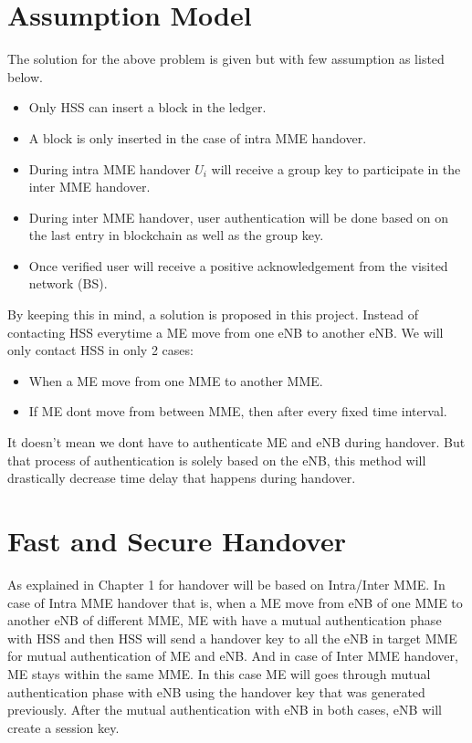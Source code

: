 {    \section{Assumption Model}{
        The solution for the above problem is given but with few 
        assumption as listed below.
        \begin{itemize}
            \item Only HSS can insert a block in the ledger.
            \item A block is only inserted in the case of intra MME handover.
            \item During intra MME handover \(U_i\) will receive a group key to
             participate in the inter MME handover.
            \item During inter MME handover, user authentication will be done based on
             on the last entry in blockchain as well as the group key.
            \item Once verified user will receive a positive acknowledgement from the
             visited network (BS).
        \end{itemize}

    }

    By keeping this in mind, a solution is proposed in this project. Instead of contacting
    HSS everytime a ME move from one eNB to another eNB. We will only contact HSS in only 2 
    cases:
    \begin{itemize}
        \item When a ME move from one MME to another MME.
        \item If ME dont move from between MME, then after every fixed time interval.
    \end{itemize}
    It doesn't mean we dont have to authenticate ME and eNB during handover. But that process
    of authentication is solely based on the eNB, this method will drastically decrease
    time delay that happens during handover.\\
    \section{Fast and Secure Handover}

    As explained in Chapter 1 for handover will be based on Intra/Inter MME.
    In case of Intra MME handover that is, when a ME move from eNB of one MME to 
    another eNB of different MME, ME with have a
    mutual authentication phase with HSS and then HSS will send a handover key to
    all the eNB in target MME for mutual authentication of ME and eNB. 
    And in case of Inter MME handover, ME stays within the same MME. In this case ME will
    goes through mutual authentication phase with eNB using the handover key that was
    generated previously. After the mutual authentication with eNB in both cases, 
    eNB will create a session key.\\

}
